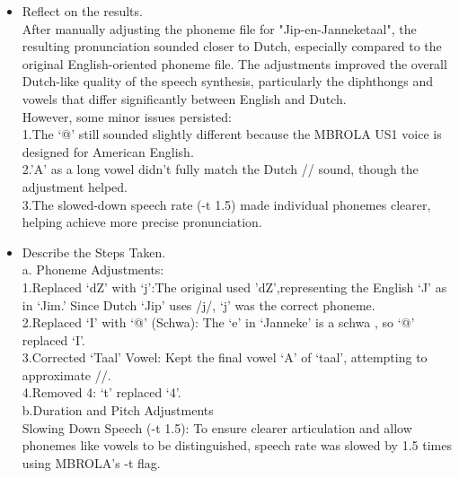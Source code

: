 \documentclass{../labbook}
\begin{document}
\begin{solution}
\begin{itemize}
    \item Reflect on the results.\\
    After manually adjusting the phoneme file for "Jip-en-Janneketaal", the resulting pronunciation sounded closer to Dutch, especially compared to the original English-oriented phoneme file. The adjustments improved the overall Dutch-like quality of the speech synthesis, particularly the diphthongs and vowels that differ significantly between English and Dutch.\\
    However, some minor issues persisted:\\
    1.The ‘@’ still sounded slightly different because the MBROLA US1 voice is designed for American English.\\
    2.'A' as a long vowel didn't fully match the Dutch // sound, though the adjustment helped.\\
    3.The slowed-down speech rate (-t 1.5) made individual phonemes clearer, helping achieve more precise pronunciation.\\
\end{itemize}

\begin{itemize}
   \item Describe the Steps Taken.\\
    a. Phoneme Adjustments:\\
    1.Replaced ‘dZ' with ‘j':The original used 'dZ',representing the English ‘J' as in ‘Jim.' Since Dutch ‘Jip' uses /j/, ‘j' was the correct phoneme.\\
    2.Replaced ‘I' with ‘@' (Schwa): The ‘e' in ‘Janneke' is a schwa , so ‘@' replaced ‘I'.\\
    3.Corrected ‘Taal' Vowel: Kept the final vowel ‘A' of ‘taal', attempting to approximate /{}/.\\
    4.Removed 4: ‘t' replaced ‘4'.\\
    b.Duration and Pitch Adjustments\\
    Slowing Down Speech (-t 1.5): To ensure clearer articulation and allow phonemes like vowels to be distinguished, speech rate was slowed by 1.5 times using MBROLA’s -t flag.
\end{itemize}
\end{solution}
\end{document}
